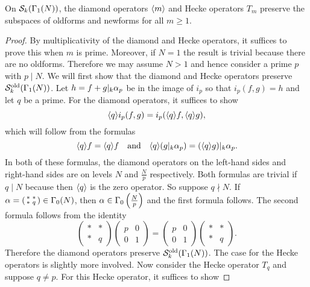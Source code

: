     \begin{proposition}\label{prop:old/new_subspaces_are_invariant_holomorphic}
      On $\mathcal{S}_{k}(\Gamma_{1}(N))$, the diamond operators $\langle m\rangle$ and Hecke operators $T_{m}$ preserve the subspaces of oldforms and newforms for all $m \ge 1$.
    \end{proposition}
    \begin{proof}
      By multiplicativity of the diamond and Hecke operators, it suffices to prove this when $m$ is prime. Moreover, if $N = 1$ the result is trivial because there are no oldforms. Therefore we may assume $N > 1$ and hence consider a prime $p$ with $p \mid N$. We will first show that the diamond and Hecke operators preserve $\mathcal{S}_{k}^{\mathrm{old}}(\Gamma_{1}(N))$. Let $h = f+g|_{k}\alpha_{p}$ be in the image of $i_{p}$ so that $i_{p}(f,g) = h$ and let $q$ be a prime. For the diamond operators, it suffices to show
      \[
        \langle q\rangle i_{p}(f,g) = i_{p}(\langle q\rangle f,\langle q\rangle g),
      \]
      which will follow from the formulas
      \[
        \langle q\rangle f = \langle q\rangle f \quad \text{and} \quad \langle q\rangle(g|_{k}\alpha_{p}) = (\langle q\rangle g)|_{k}\alpha_{p}.
      \]
      In both of these formulas, the diamond operators on the left-hand sides and right-hand sides are on levels $N$ and $\frac{N}{p}$ respectively. Both formulas are trivial if $q \mid N$ because then $\langle q\rangle$ is the zero operator. So suppose $q \nmid N$. If $\alpha = \begin{psmallmatrix} \ast & \ast \\ \ast & q \end{psmallmatrix} \in \Gamma_{0}(N)$, then $\alpha \in \Gamma_{0}\left(\frac{N}{p}\right)$ and the first formula follows. The second formula follows from the identity
      \[
        \begin{pmatrix} \ast & \ast \\ \ast & q \end{pmatrix}\begin{pmatrix} p & 0 \\ 0 & 1 \end{pmatrix} = \begin{pmatrix} p & 0 \\ 0 & 1 \end{pmatrix}\begin{pmatrix} \ast & \ast \\ \ast & q \end{pmatrix}.
      \]
      Therefore the diamond operators preserve $\mathcal{S}_{k}^{\mathrm{old}}(\Gamma_{1}(N))$. The case for the Hecke operators is slightly more involved. Now consider the Hecke operator $T_{q}$ and suppose $q \neq p$. For this Hecke operator, it suffices to show

\end{proof}
